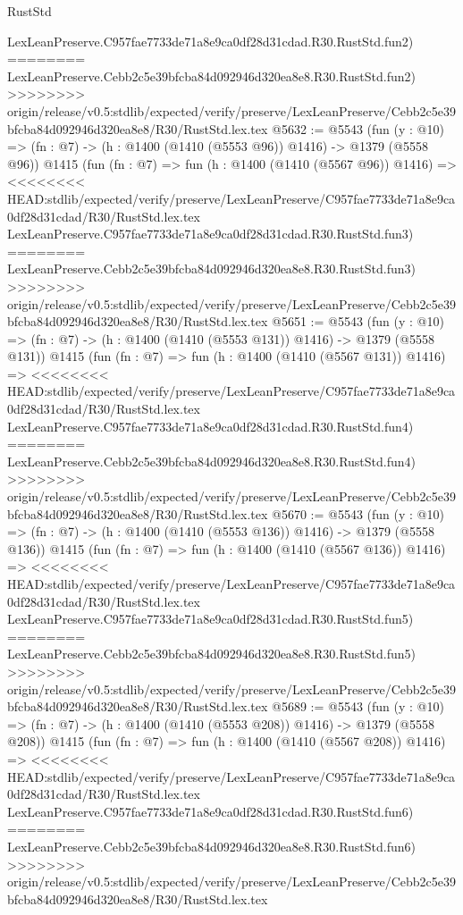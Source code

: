 \begin{lexlean}{RustStd}
\begin{coremodule}
{\begin{coremodule}
{{{{{{{{{{{    LexLeanPreserve.C957fae7733de71a8e9ca0df28d31cdad.R30.RustStd.fun2)
========
    LexLeanPreserve.Cebb2c5e39bfcba84d092946d320ea8e8.R30.RustStd.fun2)
>>>>>>>> origin/release/v0.5:stdlib/expected/verify/preserve/LexLeanPreserve/Cebb2c5e39bfcba84d092946d320ea8e8/R30/RustStd.lex.tex
@5632 := @5543
    (fun (y : @10) => (fn : @7) -> (h : @1400 (@1410 (@5553 @96)) @1416) -> @1379 (@5558 @96))
    @1415
    (fun (fn : @7) =>
    fun (h : @1400 (@1410 (@5567 @96)) @1416) =>
<<<<<<<< HEAD:stdlib/expected/verify/preserve/LexLeanPreserve/C957fae7733de71a8e9ca0df28d31cdad/R30/RustStd.lex.tex
    LexLeanPreserve.C957fae7733de71a8e9ca0df28d31cdad.R30.RustStd.fun3)
========
    LexLeanPreserve.Cebb2c5e39bfcba84d092946d320ea8e8.R30.RustStd.fun3)
>>>>>>>> origin/release/v0.5:stdlib/expected/verify/preserve/LexLeanPreserve/Cebb2c5e39bfcba84d092946d320ea8e8/R30/RustStd.lex.tex
@5651 := @5543
    (fun (y : @10) => (fn : @7) -> (h : @1400 (@1410 (@5553 @131)) @1416) -> @1379 (@5558 @131))
    @1415
    (fun (fn : @7) =>
    fun (h : @1400 (@1410 (@5567 @131)) @1416) =>
<<<<<<<< HEAD:stdlib/expected/verify/preserve/LexLeanPreserve/C957fae7733de71a8e9ca0df28d31cdad/R30/RustStd.lex.tex
    LexLeanPreserve.C957fae7733de71a8e9ca0df28d31cdad.R30.RustStd.fun4)
========
    LexLeanPreserve.Cebb2c5e39bfcba84d092946d320ea8e8.R30.RustStd.fun4)
>>>>>>>> origin/release/v0.5:stdlib/expected/verify/preserve/LexLeanPreserve/Cebb2c5e39bfcba84d092946d320ea8e8/R30/RustStd.lex.tex
@5670 := @5543
    (fun (y : @10) => (fn : @7) -> (h : @1400 (@1410 (@5553 @136)) @1416) -> @1379 (@5558 @136))
    @1415
    (fun (fn : @7) =>
    fun (h : @1400 (@1410 (@5567 @136)) @1416) =>
<<<<<<<< HEAD:stdlib/expected/verify/preserve/LexLeanPreserve/C957fae7733de71a8e9ca0df28d31cdad/R30/RustStd.lex.tex
    LexLeanPreserve.C957fae7733de71a8e9ca0df28d31cdad.R30.RustStd.fun5)
========
    LexLeanPreserve.Cebb2c5e39bfcba84d092946d320ea8e8.R30.RustStd.fun5)
>>>>>>>> origin/release/v0.5:stdlib/expected/verify/preserve/LexLeanPreserve/Cebb2c5e39bfcba84d092946d320ea8e8/R30/RustStd.lex.tex
@5689 := @5543
    (fun (y : @10) => (fn : @7) -> (h : @1400 (@1410 (@5553 @208)) @1416) -> @1379 (@5558 @208))
    @1415
    (fun (fn : @7) =>
    fun (h : @1400 (@1410 (@5567 @208)) @1416) =>
<<<<<<<< HEAD:stdlib/expected/verify/preserve/LexLeanPreserve/C957fae7733de71a8e9ca0df28d31cdad/R30/RustStd.lex.tex
    LexLeanPreserve.C957fae7733de71a8e9ca0df28d31cdad.R30.RustStd.fun6)
========
    LexLeanPreserve.Cebb2c5e39bfcba84d092946d320ea8e8.R30.RustStd.fun6)
>>>>>>>> origin/release/v0.5:stdlib/expected/verify/preserve/LexLeanPreserve/Cebb2c5e39bfcba84d092946d320ea8e8/R30/RustStd.lex.tex
}}}}}}}}}}}
\end{coremodule}}
\end{coremodule}
\end{lexlean}
